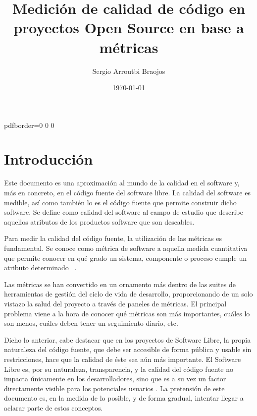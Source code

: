 \documentclass[11pt]{article}
\title{\textbf{Medición de calidad de código en proyectos Open Source en base a métricas}}
\author{Sergio Arroutbi Braojos}
\date{\today}
\begin{document}
\hypersetup
{   
pdfborder={0 0 0}
}
   
\maketitle

\pagebreak

\tableofcontents

\pagebreak

\section{Introducción}

Este documento es una aproximación al mundo de la calidad en el software y, más en concreto, en el código fuente del software libre. La calidad del software es medible, así como también lo es el código fuente que permite construir dicho software. Se define como calidad del software al campo de estudio que describe aquellos atributos de los productos software que son deseables.

Para medir la calidad del código fuente, la utilización de las métricas es fundamental. Se conoce como métrica de software a aquella medida cuantitativa que permite conocer en qué grado un sistema, componente o proceso cumple un atributo determinado ~\cite{ieeeglossary:softwareengineeringterminology}.

Las métricas se han convertido en un ornamento más dentro de las suites de herramientas de gestión del ciclo de vida de desarrollo, proporcionando de un solo vistazo la salud del proyecto a través de paneles de métricas.
El principal problema viene a la hora de conocer qué métricas son más importantes, cuáles lo son menos, cuáles deben tener un seguimiento diario, etc. ~\cite{abistock:usingmetrics}

Dicho lo anterior, cabe destacar que en los proyectos de Software Libre, la propia naturaleza del código fuente, que debe ser accesible de forma pública y usable sin restricciones, hace que la calidad de éste sea aún más importante. El Software Libre es, por su naturaleza, transparencia, y la calidad del código fuente no impacta únicamente en los desarrolladores, sino que es a su vez un factor directamente visible para los potenciales usuarios .
La pretensión de este documento es, en la medida de lo posible, y de forma gradual, intentar llegar a aclarar parte de estos conceptos.
\end{document}
